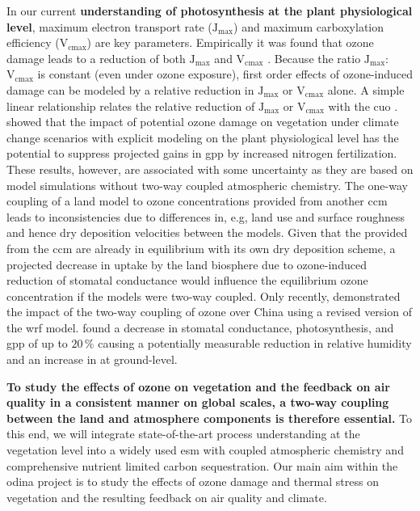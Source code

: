 In our current \textbf{understanding of photosynthesis at the plant physiological level}, maximum electron transport rate ($\mathrm{J_{max}}$) and maximum carboxylation efficiency ($\mathrm{V_{cmax}}$) are key parameters. Empirically it was found that ozone damage leads to a reduction of both $\mathrm{J_{max}}$ and $\mathrm{V_{cmax}}$ \parencite{EJA:Emberson2018}. Because the ratio $\mathrm{J_{max}}$:$\mathrm{V_{cmax}}$ is constant (even under ozone exposure), first order effects of ozone-induced damage can be modeled by a relative reduction in $\mathrm{J_{max}}$ or $\mathrm{V_{cmax}}$ alone. A simple linear relationship relates the relative reduction of $\mathrm{J_{max}}$ or $\mathrm{V_{cmax}}$ with the \gls{cuo} \parencites{BGS:Franz2017}{BGS:Franz2018}. \textcite{BGSD:Franz2020} showed that the impact of potential ozone damage on vegetation under climate change scenarios with explicit modeling on the plant physiological level has the potential to suppress projected gains in \gls{gpp} by increased nitrogen fertilization. These results, however, are associated with some uncertainty as they are based on model simulations without two-way coupled atmospheric chemistry. The one-way coupling of a land model to ozone concentrations provided from another \gls{ccm} leads to inconsistencies due to differences in, e.g, land use and surface roughness and hence dry deposition velocities between the models. Given that the provided \ch{[O_3]} from the \gls{ccm} are already in equilibrium with its own dry deposition scheme, a projected decrease in uptake by the land biosphere due to ozone-induced reduction of stomatal conductance would influence the equilibrium ozone concentration if the models were two-way coupled.
Only recently, \textcite{ACP:Zhu2021} demonstrated the impact of the two-way coupling of ozone over China using a revised version of the \gls{wrf} model. \textcite{ACP:Zhu2021} found a decrease in stomatal conductance, photosynthesis, and \gls{gpp} of up to $20\,\%$ causing a potentially measurable reduction in relative humidity and an increase in \ch{[O_3]} at ground-level.

\textbf{To study the effects of ozone on vegetation and the feedback on air quality in a consistent manner on global scales, a two-way coupling between the land and atmosphere components is therefore essential.} To this end, we will integrate state-of-the-art process understanding at the vegetation level into a widely used \gls{esm} with coupled atmospheric chemistry and comprehensive nutrient limited carbon sequestration. Our main aim within the \gls{odina} project is to study the effects of ozone damage and thermal stress on vegetation and the resulting feedback on air quality and climate.

